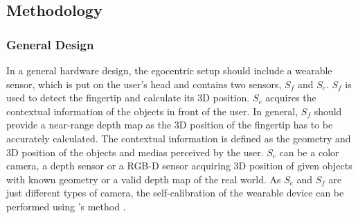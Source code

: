 \subsection{Methodology} \label{Methodology}
\subsubsection{General Design} \label{sec:4:generalDesign}
In a general hardware design, the egocentric setup should include a wearable sensor, which is put on the user's head and contains two sensors, $S_{f}$ and $S_{c}$. $S_f$ is used to detect the fingertip and calculate its 3D position. $S_c$ acquires the contextual information of the objects in front of the user. In general, $S_f$ should provide a near-range depth map as the 3D position of the fingertip has to be accurately calculated. 
{The contextual information is defined as the geometry and 3D position of the objects and medias perceived by the user.} $S_c$ can be a color camera, a depth sensor or a RGB-D sensor acquiring 3D position of given objects with known geometry or a valid depth map of the real world. 
As $S_{c}$ and $S_{f}$ are just different types of camera, the self-calibration of the wearable device can be performed using \citeauthor{Zhang2000}{\rq}s method \cite{Zhang2000}.

